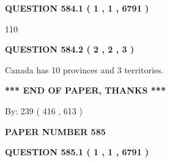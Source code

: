 \documentclass[12pt]{article}
\begin{document}
   
  
\vspace{0.2in}
  
{\textbf{\Large{QUESTION
584.1 
 ( 1 , 1 , 6791 )
}}}
  
  
 
 
\noindent{}

110
 
 
  
\vspace{0.2in}
  
{\textbf{\Large{QUESTION
584.2 
 ( 2 , 2 , 3 )
}}}
  
  
 
 
\noindent{}
 
 
Canada has 10  provinces and 3 territories.
 
 
 
 
   
   
 \vspace{0.2in}
 
   
   
   
   
\vspace{1.0in} 
{\textbf{\large{ *** END OF PAPER, THANKS *** }}} 
   
   
\hspace{1.0in} By: 
 239 ( 416 ,  613 )
   
   
   
   
\newpage 
\setcounter{page}{ 
   585001 } 
   
   
   
   
 {\textbf{ \Large{ PAPER NUMBER  585  }}}
   
   
\vspace{0.2in}
   
   
   
   
   
   
 \vspace{0.2in}
 
 
 
 
   
   
  
\vspace{0.2in}
  
{\textbf{\Large{QUESTION
585.1 
 ( 1 , 1 , 6791 )
}}}
  
\end{document}
